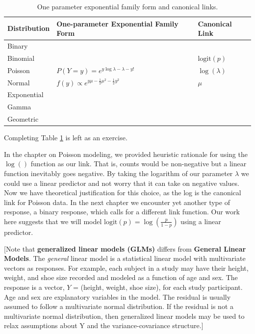 \documentclass[
]{krantz}
\begin{document}
\begin{table}[t]

\caption{\label{tab:table1chp5}One parameter exponential family form and canonical links.}
\centering
\begin{tabular}{lll}
\toprule
Distribution & One-parameter Exponential Family Form & Canonical Link\\
\midrule
Binary &  & \\
Binomial &  & $\text{logit}(p)$\\
Poisson & $P(Y=y) = e^{y\log\lambda - \lambda - y!}$ & $\log(\lambda)$\\
Normal & $f(y) \propto e^{y\mu -\frac{1}{2}\mu^2 -\frac{1}{2}y^2}$ & $\mu$\\
Exponential &  & \\
\addlinespace
Gamma &  & \\
Geometric &  & \\
\bottomrule
\end{tabular}
\end{table}

Completing Table \ref{tab:table1chp5} is left as an exercise.

In the chapter on Poisson modeling, we provided heuristic rationale for using the \(\log()\) function as our link. That is, counts would be non-negative but a linear function inevitably goes negative. By taking the logarithm of our parameter \(\lambda\) we could use a linear predictor and not worry that it can take on negative values. Now we have theoretical justification for this choice, as the log is the canonical link for Poisson data. In the next chapter we encounter yet another type of response, a binary response, which calls for a different link function. Our work here suggests that we will model \(\text{logit}(p)=\log\left(\frac{p}{1-p}\right)\) using a linear predictor.

{[}Note that \textbf{generalized linear models (GLMs)} differs from \textbf{General Linear Models}. The \emph{general} linear model is a statistical linear model with multivariate vectors as responses. For example, each subject in a study may have their height, weight, and shoe size recorded and modeled as a function of age and sex. The response is a vector, \(Y\) = (height, weight, shoe size), for each study participant. Age and sex are explanatory variables in the model. The residual is usually assumed to follow a multivariate normal distribution. If the residual is not a multivariate normal distribution, then generalized linear models may be used to relax assumptions about Y and the variance-covariance structure.{]}
\end{document}
